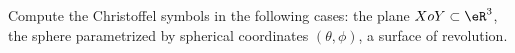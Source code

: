 \begin{exercice}\label{exo015}

 Compute the Christoffel symbols in the following cases: the plane $XoY\subset \eR^3$, the sphere parametrized by spherical coordinates $(\theta,\phi)$, a surface of revolution.

\end{exercice}


